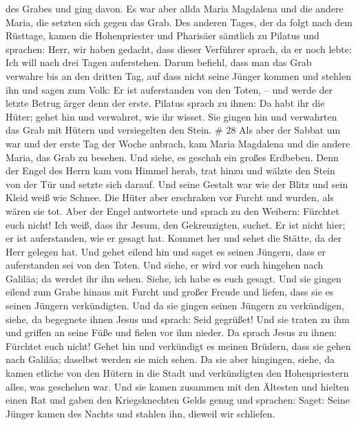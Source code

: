 des Grabes und ging davon.  Es war aber allda Maria
Magdalena und die andere Maria, die setzten sich gegen das Grab.
 Des anderen Tages, der da folgt nach dem Rüsttage, kamen
die Hohenpriester und Pharisäer sämtlich zu Pilatus  und
sprachen: Herr, wir haben gedacht, dass dieser Verführer sprach, da er
noch lebte: Ich will nach drei Tagen auferstehen.  Darum
befiehl, dass man das Grab verwahre bis an den dritten Tag, auf dass
nicht seine Jünger kommen und stehlen ihn und sagen zum Volk: Er ist
auferstanden von den Toten, -- und werde der letzte Betrug ärger denn
der erste.  Pilatus sprach zu ihnen: Da habt ihr die Hüter;
gehet hin und verwahret, wie ihr wisset.  Sie gingen hin
und verwahrten das Grab mit Hütern und versiegelten den Stein. \# 28
 Als aber der Sabbat um war und der erste Tag der Woche
anbrach, kam Maria Magdalena und die andere Maria, das Grab zu besehen.
 Und siehe, es geschah ein großes Erdbeben. Denn der Engel
des Herrn kam vom Himmel herab, trat hinzu und wälzte den Stein von der
Tür und setzte sich darauf.  Und seine Gestalt war wie der
Blitz und sein Kleid weiß wie Schnee.  Die Hüter aber
erschraken vor Furcht und wurden, als wären sie tot.  Aber
der Engel antwortete und sprach zu den Weibern: Fürchtet euch nicht! Ich
weiß, dass ihr Jesum, den Gekreuzigten, suchet.  Er ist
nicht hier; er ist auferstanden, wie er gesagt hat. Kommet her und sehet
die Stätte, da der Herr gelegen hat.  Und gehet eilend hin
und saget es seinen Jüngern, dass er auferstanden sei von den Toten. Und
siehe, er wird vor euch hingehen nach Galiläa; da werdet ihr ihn sehen.
Siehe, ich habe es euch gesagt.  Und sie gingen eilend zum
Grabe hinaus mit Furcht und großer Freude und liefen, dass sie es seinen
Jüngern verkündigten. Und da sie gingen seinen Jüngern zu verkündigen,
 siehe, da begegnete ihnen Jesus und sprach: Seid gegrüßet!
Und sie traten zu ihm und griffen an seine Füße und fielen vor ihm
nieder.  Da sprach Jesus zu ihnen: Fürchtet euch nicht!
Gehet hin und verkündigt es meinen Brüdern, dass sie gehen nach Galiläa;
daselbst werden sie mich sehen.  Da sie aber hingingen,
siehe, da kamen etliche von den Hütern in die Stadt und verkündigten den
Hohenpriestern alles, was geschehen war.  Und sie kamen
zusammen mit den Ältesten und hielten einen Rat und gaben den
Kriegsknechten Gelds genug  und sprachen: Saget: Seine
Jünger kamen des Nachts und stahlen ihn, dieweil wir schliefen.
